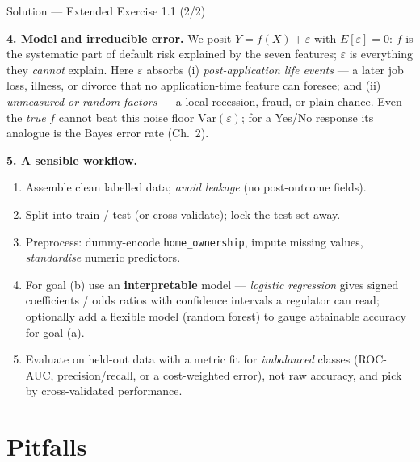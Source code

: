 \documentclass[aspectratio=169,11pt]{beamer}
\begin{document}
\begin{frame}{Solution --- Extended Exercise 1.1 (2/2)}
\begin{solutionbox}
\textbf{4. Model and irreducible error.} We posit $Y=f(X)+\varepsilon$ with $E[\varepsilon]=0$: $f$ is the systematic part of default risk explained by the seven features; $\varepsilon$ is everything they \emph{cannot} explain. Here $\varepsilon$ absorbs (i) \emph{post-application life events} --- a later job loss, illness, or divorce that no application-time feature can foresee; and (ii) \emph{unmeasured or random factors} --- a local recession, fraud, or plain chance. Even the \emph{true} $f$ cannot beat this noise floor $\mathrm{Var}(\varepsilon)$; for a Yes/No response its analogue is the Bayes error rate (Ch.~2).

\textbf{5. A sensible workflow.}
\begin{enumerate}\setlength\itemsep{0pt}
  \item Assemble clean labelled data; \emph{avoid leakage} (no post-outcome fields).
  \item Split into train / test (or cross-validate); lock the test set away.
  \item Preprocess: dummy-encode \texttt{home\_ownership}, impute missing values, \emph{standardise} numeric predictors.
  \item For goal (b) use an \textbf{interpretable} model --- \emph{logistic regression} gives signed coefficients / odds ratios with confidence intervals a regulator can read; optionally add a flexible model (random forest) to gauge attainable accuracy for goal (a).
  \item Evaluate on held-out data with a metric fit for \emph{imbalanced} classes (ROC-AUC, precision/recall, or a cost-weighted error), not raw accuracy, and pick by cross-validated performance.
\end{enumerate}
\end{solutionbox}
\end{frame}


\section{Pitfalls}
\end{document}
